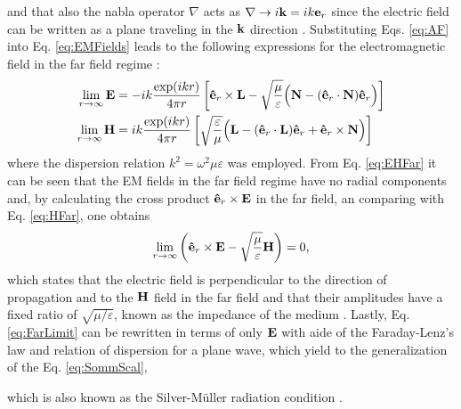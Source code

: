 %
and that also the nabla operator $\nabla$ acts as $\nabla\to i\vb{k} = ik\vb{e}_r$ since the electric field can be written as a plane traveling in the $\vb{k}$ direction \cite{jin_theory_2010,jackson_classical_1999}. Substituting Eqs. \eqref{eq:AF} into Eq. \eqref{eq:EMFields} leads to the following expressions for the electromagnetic field in the far field regime \cite{jin_theory_2010}:
%
\begin{subequations}
    \label{eq:EHFar}
\begin{align}
    \lim_{r\to\infty}\vb{E} &= -i k\frac{\exp(ikr)}{4\pi r}
                \left[ \vu{e}_r\times\vb{L}-\sqrt{\frac{\mu}{\varepsilon}}  \Big(\vb{N}-(\vu{e}_r\cdot\vb{N})\vu{e}_r\Big) \right]
            \label{eq:EFar}\\
    \lim_{r\to\infty}\vb{H} &=i k\frac{\exp(ikr)}{4\pi r}
                \left[\sqrt{\frac{\varepsilon}{\mu}}  \Big(\vb{L}-(\vu{e}_r\cdot\vb{L})\vu{e}_r + \vu{e}_r\times\vb{N}\Big) \right]
             \label{eq:HFar}
\end{align}
\end{subequations}
%
where the dispersion relation $k^2 = \omega^2\mu\varepsilon$ was employed. From Eq. \eqref{eq:EHFar} it can be seen that the EM fields in the far field regime have no radial components and, by calculating the cross product $\vu{e}_r\times\vb{E}$ in the far field, an comparing with Eq. \eqref{eq:HFar}, one obtains
%
\begin{align}
    \lim_{r\to\infty} \qty(\vu{e}_r\times\vb{E} - \sqrt{\frac{\mu}{\varepsilon}} \vb{H}) = 0,
    \label{eq:FarLimit}
\end{align}
%
which states that the electric field is perpendicular to the direction of propagation and to the $\vb{H}$ field in the far field and that their amplitudes have a fixed ratio of $\sqrt{{\mu}/{\varepsilon}}$, known as the impedance of the medium \cite{jin_theory_2010,schot_eighty_1992}. Lastly, Eq. \eqref{eq:FarLimit} can be rewritten in terms of only $\vb{E}$ with aide of the Faraday-Lenz's law and relation of dispersion for a plane wave, which yield to the generalization of the Eq. \eqref{eq:SommScal},
%
%
 \noindent%
which is also known as the Silver-Müller radiation condition \cite{colton_inverse_2019,silver_microwave_1984}.

